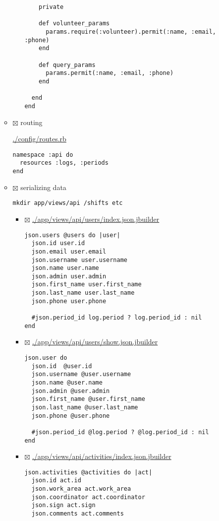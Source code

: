 \documentclass[11pt]{article}
\begin{document}
\begin{itemize}
\begin{itemize}
\begin{itemize}
\begin{verbatim}
    private

    def volunteer_params
      params.require(:volunteer).permit(:name, :email, :phone)
    end

    def query_params
      params.permit(:name, :email, :phone)
    end

  end
end
\end{verbatim}
\end{itemize}

\item $\boxtimes$ routing

\url{./config/routes.rb}

\begin{verbatim}
namespace :api do
  resources :logs, :periods
end
\end{verbatim}

\item $\boxtimes$ serializing data

\begin{verbatim}
mkdir app/views/api /shifts etc
\end{verbatim}

\begin{itemize}
\item $\boxtimes$ \url{./app/views/api/users/index.json.jbuilder}

\begin{verbatim}
json.users @users do |user|
  json.id user.id
  json.email user.email
  json.username user.username
  json.name user.name
  json.admin user.admin
  json.first_name user.first_name
  json.last_name user.last_name
  json.phone user.phone

  #json.period_id log.period ? log.period_id : nil
end
\end{verbatim}

\item $\boxtimes$ \url{./app/views/api/users/show.json.jbuilder}

\begin{verbatim}
json.user do
  json.id  @user.id
  json.username @user.username
  json.name @user.name
  json.admin @user.admin
  json.first_name @user.first_name
  json.last_name @user.last_name  
  json.phone @user.phone

  #json.period_id @log.period ? @log.period_id : nil
end
\end{verbatim}

\item $\boxtimes$ \url{./app/views/api/activities/index.json.jbuilder}

\begin{verbatim}
json.activities @activities do |act|
  json.id act.id
  json.work_area act.work_area
  json.coordinator act.coordinator
  json.sign act.sign
  json.comments act.comments


\end{verbatim}
\end{itemize}
\end{itemize}
\end{itemize}
\end{document}
